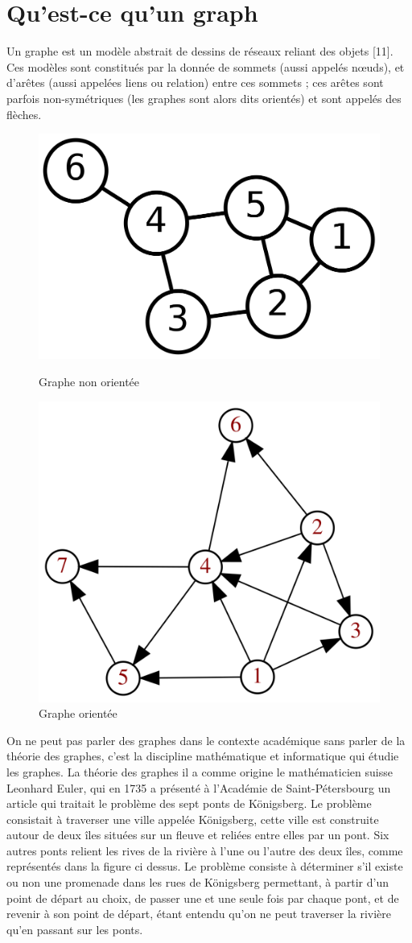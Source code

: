 \section{Qu’est-ce qu’un graph}
Un graphe est un modèle abstrait de dessins de réseaux reliant des objets [11]. Ces modèles sont constitués par la donnée de sommets (aussi appelés nœuds), et d'arêtes (aussi appelées liens ou relation) entre ces sommets ; ces arêtes sont parfois non-symétriques (les graphes sont alors dits orientés) et sont appelés des flèches.\\

\begin{figure}[h!]  
  \centering
    \includegraphics[width=0.5 \textwidth]{chapitre2/Figures/GraphNonOriontee.png}
  \caption{Graphe non orientée}
  \centering
    \includegraphics[width=0.5 \textwidth]{chapitre2/Figures/GraphOriontee.png}
  \caption{Graphe orientée}
\end{figure}

On ne peut pas parler des graphes dans le contexte académique sans parler de la théorie des graphes, c’est la discipline mathématique et informatique qui étudie les graphes. La théorie des graphes il a comme origine le mathématicien suisse Leonhard Euler, qui en 1735 a présenté à l'Académie de Saint-Pétersbourg un article qui traitait le problème des sept ponts de Königsberg. Le problème consistait à traverser une ville appelée Königsberg, cette ville est construite autour de deux îles situées sur un fleuve et reliées entre elles par un pont. Six autres ponts relient les rives de la rivière à l'une ou l'autre des deux îles, comme représentés dans la figure ci dessus. Le problème consiste à déterminer s'il existe ou non une promenade dans les rues de Königsberg permettant, à partir d'un point de départ au choix, de passer une et une seule fois par chaque pont, et de revenir à son point de départ, étant entendu qu'on ne peut traverser la rivière qu'en passant sur les ponts.\\

